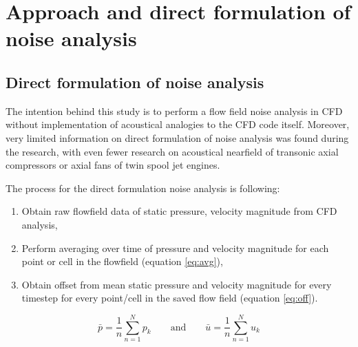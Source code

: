 
\chapter{Approach and direct formulation of noise analysis} %
\label{approach} %


\section{Direct formulation of noise analysis} \label{direct_approach}
The intention behind this study is to perform a flow field noise analysis in CFD without implementation of acoustical analogies to the CFD code itself. Moreover, very limited information on direct formulation of noise analysis was found during the research, with even fewer research on acoustical nearfield of transonic axial compressors or axial fans of twin spool jet engines.

The process for the direct formulation noise analysis is following:
\begin{enumerate}
\item Obtain raw flowfield data of static pressure, velocity magnitude from CFD analysis,
\item Perform averaging over time of pressure and velocity magnitude for each point or cell in the flowfield (equation \ref{eq:avg}),
\item Obtain offset from mean static pressure and velocity magnitude for every timestep for every point/cell in the saved flow field (equation \ref{eq:off}).		
\end{enumerate}


\begin{equation} \label{eq:avg}
\bar{p} = \frac{1}{n} \sum_{n=1}^{N} p_k \qquad \text{and} \qquad \bar{u} = \frac{1}{n} \sum_{n=1}^{N} u_k
\end{equation}

